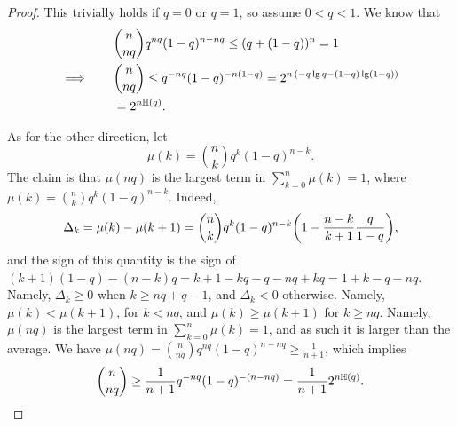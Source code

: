 \begin{proof}
    This trivially holds if $q=0$ or $q=1$, so assume $0 <q <1$. We
    know that
    \begin{align*}
      &\binom{n}{nq}
      q^{nq} (1-q)^{n-nq} \leq (q + (1-q))^n
        =1
      \\
      \implies
      \qquad        
      &
        \binom{n}{nq}
        \leq 
        q^{-nq} (1-q)^{-n(1-q)} = 2^{n \,\pth{-q \lg q - (1-q) \lg (1-q)
        }} \\
        &= 2^{n \Entropy{q}}.
    \end{align*}
    
    As for the other direction, let
    \begin{equation*}
        \mu(k) = \binom{n}{k} q^{k} (1-q)^{n-k}.
    \end{equation*}    
    The claim is that $\mu(nq)$ is the largest term in
    $\sum_{k=0}^{n} \mu(k) = 1$, where
    $\mu(k ) = \binom{n}{k} q^k (1-q)^{n-k}$. Indeed,
    \begin{equation*}
        \Delta_k = \mu(k) - \mu(k+1) = \binom{n}{k}q^k (1-q)^{n-k}
        \pth{ 1 - \frac{n-k}{k+1} \frac{q}{1-q}},
    \end{equation*}
    and the sign of this quantity is the sign of
    $(k+1)(1-q) -(n-k)q = k +1 -kq -q -nq +kq = 1 + k -q -
    nq$. Namely, $\Delta_k \geq 0$ when $k\geq nq + q -1$, and
    $\Delta_k < 0$ otherwise. Namely, $\mu(k) < \mu(k+1)$, for
    $k < nq$, and $\mu(k) \geq \mu(k+1)$ for $k \geq nq$. Namely,
    $\mu(nq)$ is the largest term in $\sum_{k=0}^{n} \mu(k) = 1$, and
    as such it is larger than the average. We have
    $\mu(nq) = \binom{n}{nq} q^{nq} (1-q)^{n-nq} \geq \frac{1}{n+1}$,
    which implies
    \begin{equation*}
        \binom{n}{nq} \geq \frac{1}{n+1} q^{-nq} (1-q)^{-(n-nq)} =
        \frac{1}{n+1}2^{n \Entropy{q}}.
    \end{equation*}
\end{proof}

